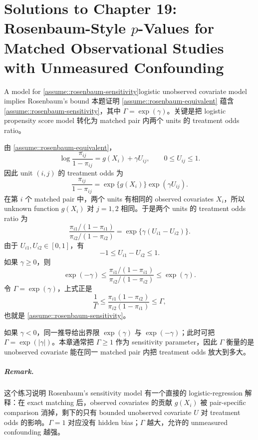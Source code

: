 \chapter{Solutions to Chapter 19: Rosenbaum-Style $p$-Values for Matched Observational Studies with Unmeasured Confounding}
\label{sol:chapter19}

\begin{exercisesolution}{A model for \cref{assume::rosenbaum-sensitivity}}{logistic unobserved covariate model implies Rosenbaum's bound}
本题证明 \cref{assume::rosenbaum-equivalent} 蕴含 \cref{assume::rosenbaum-sensitivity}，其中 $\Gamma=\exp(\gamma)$。关键是把 logistic propensity score model 转化为 matched pair 内两个 units 的 treatment odds ratio。

由 \cref{assume::rosenbaum-equivalent}，
\[
\log \frac{\pi_{ij}}{1-\pi_{ij}}
=g(X_i)+\gamma U_{ij},
\qquad 0\leq U_{ij}\leq 1.
\]
因此 unit $(i,j)$ 的 treatment odds 为
\[
\frac{\pi_{ij}}{1-\pi_{ij}}
=\exp\{g(X_i)\}\exp(\gamma U_{ij}).
\]
在第 $i$ 个 matched pair 中，两个 units 有相同的 observed covariates $X_i$，所以 unknown function $g(X_i)$ 对 $j=1,2$ 相同。于是两个 units 的 treatment odds ratio 为
\[
\frac{\pi_{i1}/(1-\pi_{i1})}{\pi_{i2}/(1-\pi_{i2})}
=
\exp\{\gamma(U_{i1}-U_{i2})\}.
\]
由于 $U_{i1},U_{i2}\in[0,1]$，有
\[
-1\leq U_{i1}-U_{i2}\leq 1.
\]
如果 $\gamma\geq 0$，则
\[
\exp(-\gamma)
\leq
\frac{\pi_{i1}/(1-\pi_{i1})}{\pi_{i2}/(1-\pi_{i2})}
\leq
\exp(\gamma).
\]
令 $\Gamma=\exp(\gamma)$，上式正是
\[
\frac{1}{\Gamma}
\leq
\frac{\pi_{i1}(1-\pi_{i2})}{\pi_{i2}(1-\pi_{i1})}
\leq
\Gamma,
\]
也就是 \cref{assume::rosenbaum-sensitivity}。

如果 $\gamma<0$，同一推导给出界限 $\exp(\gamma)$ 与 $\exp(-\gamma)$；此时可把 $\Gamma=\exp(|\gamma|)$。本章通常把 $\Gamma\geq 1$ 作为 sensitivity parameter，因此 $\Gamma$ 衡量的是 unobserved covariate 能在同一 matched pair 内把 treatment odds 放大到多大。

\paragraph{Remark.}
这个练习说明 Rosenbaum's sensitivity model 有一个直接的 logistic-regression 解释：在 exact matching 后，observed covariates 的贡献 $g(X_i)$ 被 pair-specific comparison 消掉，剩下的只有 bounded unobserved covariate $U$ 对 treatment odds 的影响。$\Gamma=1$ 对应没有 hidden bias；$\Gamma$ 越大，允许的 unmeasured confounding 越强。
\end{exercisesolution}

